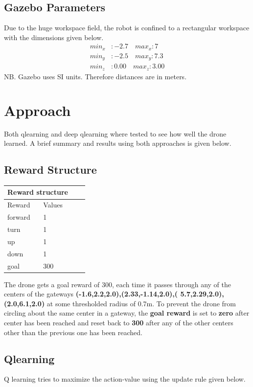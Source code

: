 \documentclass[12pt]{article}
\begin{document}
\subsection{Gazebo Parameters}
Due to the huge workspace field, the robot is confined to a rectangular workspace with the dimensions given below.
\begin{align}
  min_x&: -2.7  \quad \nonumber
max_x: 7 \\                     
  min_y&: -2.5  \quad  \nonumber
max_y: 7.3 \\                   
  min_z&: 0.00  \quad \nonumber
max_z: 3.00
\end{align}
NB. Gazebo uses SI units. Therefore distances are in meters.


\section{Approach}
Both qlearning and deep qlearning where tested to see how well the drone learned. A brief summary and results using both approaches 
is given below.
\subsection{Reward Structure}
\begin{table}[h]
  \centering
\begin{tabular}{ |p{3cm}||p{3cm}|p{3cm}|p{3cm}|  }
 \hline
 \multicolumn{2}{|c|}{Reward structure} \\
 \hline
 Reward     & Values\\
 \hline
 forward   & 1\\
 turn&   1\\
 up&1\\
 down&1\\
 goal& 300  \\
 \hline
\end{tabular}
\end{table}

The drone gets a goal reward of 300, each time it passes through any of the centers of the gateways 
\textbf{(-1.6,2.2,2.0),(2.33,-1.14,2.0),( 5.7,2.29,2.0),(2.0,6.1,2.0)} at some thresholded radius of 0.7m. 
To prevent the drone from circling about the same 
center in a gateway, the \textbf{goal reward} is set to \textbf{zero} after center has been reached and reset back to \textbf{300} after any of the other centers other than the previous one has been reached.

\subsection{Qlearning}
 Q learning tries to maximize the action-value  using the update rule given below.
\end{document}
